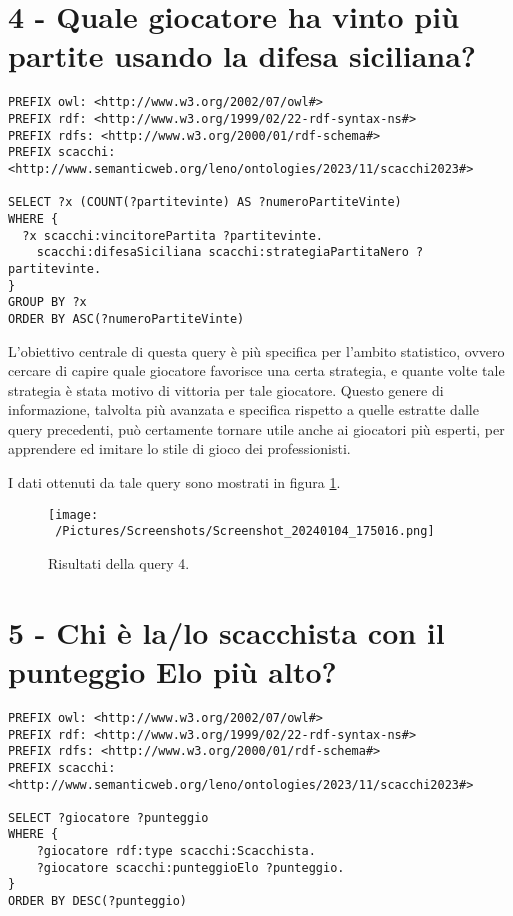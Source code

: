 \documentclass[12pt]{book}
\begin{document}
\section{4 - Quale giocatore ha vinto più partite usando la difesa siciliana?}

\begin{verbatim}
PREFIX owl: <http://www.w3.org/2002/07/owl#>
PREFIX rdf: <http://www.w3.org/1999/02/22-rdf-syntax-ns#>
PREFIX rdfs: <http://www.w3.org/2000/01/rdf-schema#>
PREFIX scacchi: <http://www.semanticweb.org/leno/ontologies/2023/11/scacchi2023#>

SELECT ?x (COUNT(?partitevinte) AS ?numeroPartiteVinte)
WHERE {
  ?x scacchi:vincitorePartita ?partitevinte.
    scacchi:difesaSiciliana scacchi:strategiaPartitaNero ?partitevinte.
}
GROUP BY ?x
ORDER BY ASC(?numeroPartiteVinte)
\end{verbatim}

L'obiettivo centrale di questa query è più specifica per l'ambito
statistico, ovvero cercare di capire quale giocatore favorisce una
certa strategia, e quante volte tale strategia è stata motivo di
vittoria per tale giocatore. Questo genere di informazione, talvolta
più avanzata e specifica rispetto a quelle estratte dalle query
precedenti, può certamente tornare utile anche ai giocatori più
esperti, per apprendere ed imitare lo stile di gioco dei
professionisti.

I dati ottenuti da tale query sono mostrati in figura \ref{fig:query4}.

\begin{figure}[h]
  \caption{Risultati della query 4.}
  \centering
  \label{fig:query4}
  \texttt{[image: ~/Pictures/Screenshots/Screenshot\_20240104\_175016.png]}
\end{figure} 

\section{5 - Chi è la/lo scacchista con il punteggio Elo più alto?}

\begin{verbatim}
PREFIX owl: <http://www.w3.org/2002/07/owl#>
PREFIX rdf: <http://www.w3.org/1999/02/22-rdf-syntax-ns#>
PREFIX rdfs: <http://www.w3.org/2000/01/rdf-schema#>
PREFIX scacchi: <http://www.semanticweb.org/leno/ontologies/2023/11/scacchi2023#>

SELECT ?giocatore ?punteggio
WHERE {
    ?giocatore rdf:type scacchi:Scacchista.
    ?giocatore scacchi:punteggioElo ?punteggio.
}
ORDER BY DESC(?punteggio)
\end{verbatim}
\end{document}
